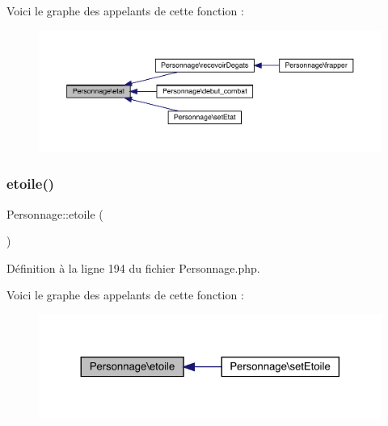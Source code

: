 Voici le graphe des appelants de cette fonction \+:\nopagebreak
\begin{figure}[H]
\begin{center}
\leavevmode
\includegraphics[width=350pt]{class_personnage_addeceec710baf3ae687f36151bc5def4_icgraph}
\end{center}
\end{figure}
\mbox{\label{class_personnage_ade67f55b78368cd7e3c92128bb7ae67d}} 
\subsubsection{\texorpdfstring{etoile()}{etoile()}}
{\footnotesize\ttfamily Personnage\+::etoile (\begin{DoxyParamCaption}{ }\end{DoxyParamCaption})}



Définition à la ligne 194 du fichier Personnage.\+php.

Voici le graphe des appelants de cette fonction \+:\nopagebreak
\begin{figure}[H]
\begin{center}
\leavevmode
\includegraphics[width=324pt]{class_personnage_ade67f55b78368cd7e3c92128bb7ae67d_icgraph}
\end{center}
\end{figure}
\mbox{\label{class_personnage_a1deaeddff5bc8766d52da4fc2d0b8032}} 
